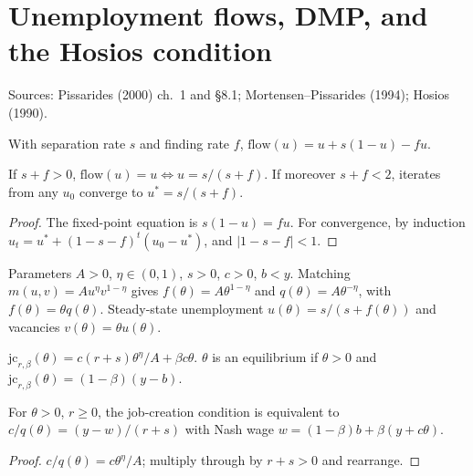 \section{Unemployment flows, DMP, and the Hosios condition}
\label{sec:dmp}

Sources: Pissarides (2000) ch.~1 and \S8.1; Mortensen--Pissarides (1994); Hosios (1990).

\begin{definition}
\label{def:dmp_flow}
\leanok
With separation rate $s$ and finding rate $f$, $\mathrm{flow}(u) = u + s(1-u) - f u$.
\end{definition}

\begin{theorem}
\label{thm:dmp_steady_unemp}
\leanok
{}
If $s + f > 0$, $\mathrm{flow}(u) = u \iff u = s/(s+f)$. If moreover $s + f < 2$, iterates from any $u_0$
converge to $u^* = s/(s+f)$.
\end{theorem}
\begin{proof}
\leanok
The fixed-point equation is $s(1 - u) = f u$. For convergence, by induction
$u_t = u^* + (1 - s - f)^t (u_0 - u^*)$, and $|1 - s - f| < 1$.
\end{proof}

\begin{definition}
\label{def:dmp_economy}
\leanok
Parameters $A > 0$, $\eta \in (0,1)$, $s > 0$, $c > 0$, $b < y$. Matching $m(u, v) = A u^\eta v^{1-\eta}$ gives
$f(\theta) = A\theta^{1-\eta}$ and $q(\theta) = A\theta^{-\eta}$, with $f(\theta) = \theta q(\theta)$. Steady-state
unemployment $u(\theta) = s/(s + f(\theta))$ and vacancies $v(\theta) = \theta u(\theta)$.
\end{definition}

\begin{definition}
\label{def:dmp_jc}
\leanok
{}
$\mathrm{jc}_{r, \beta}(\theta) = c(r + s)\theta^\eta/A + \beta c \theta$. $\theta$ is an equilibrium if $\theta > 0$ and
$\mathrm{jc}_{r,\beta}(\theta) = (1-\beta)(y - b)$.
\end{definition}

\begin{lemma}
\label{lem:dmp_jc_textbook}
\leanok
{}
For $\theta > 0$, $r \ge 0$, the job-creation condition is equivalent to
$c/q(\theta) = (y - w)/(r + s)$ with Nash wage $w = (1-\beta)b + \beta(y + c\theta)$.
\end{lemma}
\begin{proof}
\leanok
$c/q(\theta) = c\theta^\eta/A$; multiply through by $r + s > 0$ and rearrange.
\end{proof}

